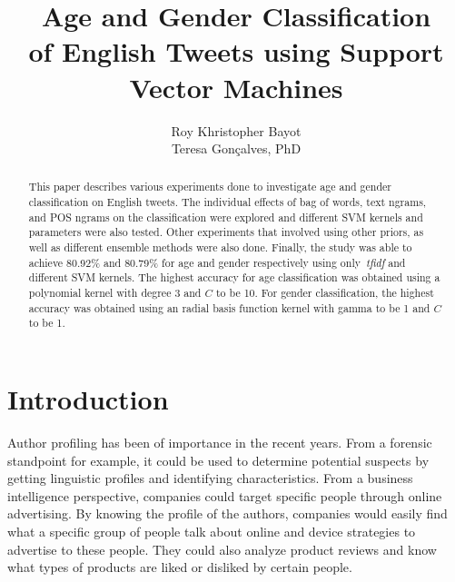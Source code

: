 \documentclass[a4paper]{llncs}
\begin{document}
\title{Age and Gender Classification\\
of English Tweets using Support Vector Machines}
\titlerunning{}
\author{Roy Khristopher Bayot\\Teresa Gonçalves, PhD}

\maketitle
\begin{abstract}
This paper describes various experiments done to investigate age and gender classification on English tweets. The individual effects of bag of words, text ngrams, and POS ngrams on the classification were explored and different SVM kernels and parameters were also tested. Other experiments that involved using other priors, as well as different ensemble methods were also done. Finally, the study was able to achieve 80.92\% and 80.79\% for age and gender respectively using only~\textit{tfidf} and different SVM kernels. The highest accuracy for age classification was obtained using a polynomial kernel with degree 3 and $C$ to be 10. For gender classification, the highest accuracy was obtained using an radial basis function kernel with gamma to be 1 and $C$ to be 1. 
\end{abstract}

\section{Introduction}
Author profiling has been of importance in the recent years. From a forensic standpoint for example, it could be used to determine potential suspects by getting linguistic profiles and identifying characteristics. From a business intelligence perspective, companies could target specific people through online advertising. By knowing the profile of the authors, companies would easily find what a specific group of people talk about online and device strategies to advertise to these people. They could also analyze product reviews and know what types of products are liked or disliked by certain people. 
\end{document}
